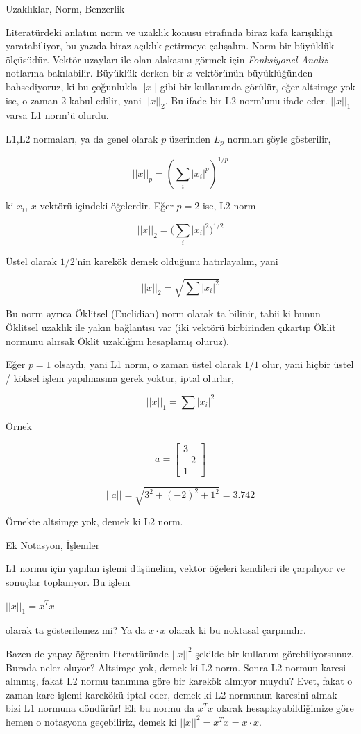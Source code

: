 \documentclass[12pt,fleqn]{article}\usepackage{../../common}
\begin{document}
Uzaklıklar, Norm, Benzerlik

Literatürdeki anlatım norm ve uzaklık konusu etrafında biraz kafa karışıklığı
yaratabiliyor, bu yazıda biraz açıklık getirmeye çalışalım. Norm bir büyüklük
ölçüsüdür. Vektör uzayları ile olan alakasını görmek için {\em Fonksiyonel
  Analiz} notlarına bakılabilir. Büyüklük derken bir $x$ vektörünün
büyüklüğünden bahsediyoruz, ki bu çoğunlukla $||x||$ gibi bir kullanımda
görülür, eğer altsimge yok ise, o zaman 2 kabul edilir, yani $||x||_2$. Bu ifade
bir L2 norm'unu ifade eder. $||x||_1$ varsa L1 norm'ü olurdu.

L1,L2 normaları, ya da genel olarak $p$ üzerinden $L_p$ normları şöyle gösterilir,

$$ ||x||_p = (\sum_i |x_i|^p)^{1/p} $$

ki $x_i$, $x$ vektörü içindeki öğelerdir. Eğer $p=2$ ise, L2 norm

$$ ||x||_2 = \bigg(\sum_i |x_i|^2 \bigg)^{1/2} $$

Üstel olarak $1/2$'nin karekök demek olduğunu hatırlayalım, yani 

$$ ||x||_2 = \sqrt{\sum |x_i|^2} $$

Bu norm ayrıca Öklitsel (Euclidian) norm olarak ta bilinir, tabii ki bunun
Öklitsel uzaklık ile yakın bağlantısı var (iki vektörü birbirinden çıkartıp
Öklit normunu alırsak Öklit uzaklığını hesaplamış oluruz).

Eğer $p=1$ olsaydı, yani L1 norm, o zaman üstel olarak $1/1$ olur, yani hiçbir
üstel / köksel işlem yapılmasına gerek yoktur, iptal olurlar,

$$ ||x||_1 = \sum |x_i|^2 $$

Örnek

$$ 
a = \left[\begin{array}{r}
3 \\ -2 \\ 1
\end{array}\right]
 $$

$$ ||a|| = \sqrt{3^2+(-2)^2+1^2} = 3.742 $$

Örnekte altsimge yok, demek ki L2 norm. 

Ek Notasyon, İşlemler

L1 normu için yapılan işlemi düşünelim, vektör öğeleri kendileri ile
çarpılıyor ve sonuçlar toplanıyor. Bu işlem

$||x||_1 = x^Tx$

olarak ta gösterilemez mi? Ya da $x \cdot x$ olarak ki bu noktasal çarpımdır.

Bazen de yapay öğrenim literatüründe $||x||^2$ şekilde bir kullanım
görebiliyorsunuz. Burada neler oluyor? Altsimge yok, demek ki L2
norm. Sonra L2 normun karesi alınmış, fakat L2 normu tanımına göre bir
karekök almıyor muydu? Evet, fakat o zaman kare işlemi karekökü iptal eder,
demek ki L2 normunun karesini almak bizi L1 normuna döndürür! Eh bu normu
da $x^Tx$ olarak hesaplayabildiğimize göre hemen o notasyona geçebiliriz,
demek ki $||x||^2 = x^Tx = x \cdot x$. 
\end{document}

